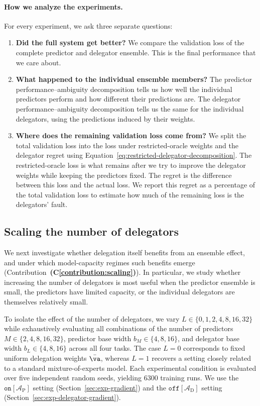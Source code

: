 \documentclass[10pt]{article} %
\newcommand{\dambiguity}{\mathcal{A}_{\mathrm{D}}}
\newcommand{\pambiguity}{\mathcal{A}_{\mathrm{P}}}
\newcommand{\ambiguityon}[1]{\ensuremath{\mathtt{on}[#1]}}
\newcommand{\ambiguityoff}[1]{\ensuremath{\mathtt{off}[#1]}}
\newcounter{contribution}
\newcommand{\contributionref}[1]{\textbf{(C\ref{contribution:#1})}}
\begin{document}
\paragraph{How we analyze the experiments.} For every experiment, we ask three separate questions:
\begin{enumerate}
    \item \textbf{Did the full system get better?} We compare the validation loss of the complete predictor and delegator ensemble. This is the final performance that we care about.
    \item \textbf{What happened to the individual ensemble members?} The predictor performance--ambiguity decomposition tells us how well the individual predictors perform and how different their predictions are. The delegator performance--ambiguity decomposition tells us the same for the individual delegators, using the predictions induced by their weights.
    \item \textbf{Where does the remaining validation loss come from?} We split the total validation loss into the loss under restricted-oracle weights and the delegator regret using Equation~\ref{eq:restricted-delegator-decomposition}. The restricted-oracle loss is what remains after we try to improve the delegator weights while keeping the predictors fixed. The regret is the difference between this loss and the actual loss. We report this regret as a percentage of the total validation loss to estimate how much of the remaining loss is the delegators' fault.
\end{enumerate}

\subsection{Scaling the number of delegators} \label{sec:exp-scaling}

We next investigate whether delegation itself benefits from an ensemble effect, and under which model-capacity regimes such benefits emerge (Contribution~\contributionref{scaling}). In particular, we study whether increasing the number of delegators is most useful when the predictor ensemble is small, the predictors have limited capacity, or the individual delegators are themselves relatively small.

To isolate the effect of the number of delegators, we vary $L \in \{0,1,2,4,8,16,32\}$ while exhaustively evaluating all combinations of the number of predictors $M \in \{2,4,8,16,32\}$, predictor base width $b_M \in \{4,8,16\}$, and delegator base width $b_L \in \{4,8,16\}$ across all four tasks. The case $L=0$ corresponds to fixed uniform delegation weights $\bar{\va}$, whereas $L=1$ recovers a setting closely related to a standard mixture-of-experts model. Each experimental condition is evaluated over five independent random seeds, yielding $6300$ training runs. We use the \ambiguityon{\pambiguity} setting (Section~\ref{sec:exp-gradient}) and the \ambiguityoff{\dambiguity} setting (Section~\ref{sec:exp-delegator-gradient}).
\end{document}
